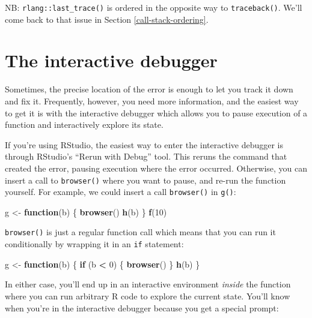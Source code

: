 \documentclass[]{book}
\makeatletter
\newenvironment{Shaded}{\begin{snugshade}}{\end{snugshade}}
\newcommand{\ControlFlowTok}[1]{\textcolor[rgb]{0.27,0.27,0.27}{\textbf{#1}}}
\newcommand{\DecValTok}[1]{\textcolor[rgb]{0.06,0.06,0.06}{#1}}
\newcommand{\KeywordTok}[1]{\textcolor[rgb]{0.27,0.27,0.27}{\textbf{#1}}}
\newcommand{\NormalTok}[1]{#1}
\newcommand{\OperatorTok}[1]{\textcolor[rgb]{0.43,0.43,0.43}{\textbf{#1}}}
\newcommand{\StringTok}[1]{\textcolor[rgb]{0.5,0.5,0.5}{#1}}
\newcommand{\indexc}[1]{\index{#1@\texttt{#1}}}
\makeatother
\begin{document}
NB: \texttt{rlang::last\_trace()} is ordered in the opposite way to \texttt{traceback()}. We'll come back to that issue in Section \ref{call-stack-ordering}.

\hypertarget{browser}{%
\section{The interactive debugger}\label{browser}}

\indexc{browser()}

Sometimes, the precise location of the error is enough to let you track it down and fix it. Frequently, however, you need more information, and the easiest way to get it is with the interactive debugger which allows you to pause execution of a function and interactively explore its state.

If you're using RStudio, the easiest way to enter the interactive debugger is through RStudio's ``Rerun with Debug'' tool. This reruns the command that created the error, pausing execution where the error occurred. Otherwise, you can insert a call to \texttt{browser()} where you want to pause, and re-run the function yourself. For example, we could insert a call \texttt{browser()} in \texttt{g()}:

\begin{Shaded}
\begin{Highlighting}[]
\NormalTok{g <-}\StringTok{ }\ControlFlowTok{function}\NormalTok{(b) \{}
  \KeywordTok{browser}\NormalTok{()}
  \KeywordTok{h}\NormalTok{(b)}
\NormalTok{\}}
\KeywordTok{f}\NormalTok{(}\DecValTok{10}\NormalTok{)}
\end{Highlighting}
\end{Shaded}

\texttt{browser()} is just a regular function call which means that you can run it conditionally by wrapping it in an \texttt{if} statement:

\begin{Shaded}
\begin{Highlighting}[]
\NormalTok{g <-}\StringTok{ }\ControlFlowTok{function}\NormalTok{(b) \{}
  \ControlFlowTok{if}\NormalTok{ (b }\OperatorTok{<}\StringTok{ }\DecValTok{0}\NormalTok{) \{}
    \KeywordTok{browser}\NormalTok{()}
\NormalTok{  \}}
  \KeywordTok{h}\NormalTok{(b)}
\NormalTok{\}}
\end{Highlighting}
\end{Shaded}

In either case, you'll end up in an interactive environment \emph{inside} the function where you can run arbitrary R code to explore the current state. You'll know when you're in the interactive debugger because you get a special prompt:
\end{document}

